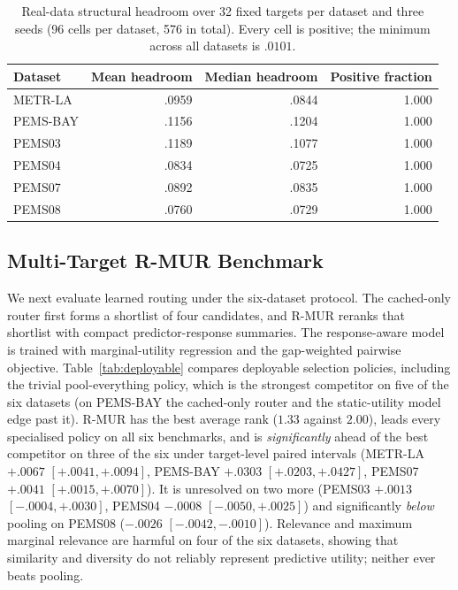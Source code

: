 \begin{table}[t]
\centering
\small
\caption{Real-data structural headroom over 32 fixed targets per dataset and
three seeds (96 cells per dataset, 576 in total). Every cell is positive; the
minimum across all datasets is $.0101$.}
\label{tab:headroom-real}
\begin{tabular}{lrrr}
\toprule
Dataset & Mean headroom & Median headroom & Positive fraction\\
\midrule
METR-LA & .0959 & .0844 & 1.000\\
PEMS-BAY & .1156 & .1204 & 1.000\\
PEMS03 & .1189 & .1077 & 1.000\\
PEMS04 & .0834 & .0725 & 1.000\\
PEMS07 & .0892 & .0835 & 1.000\\
PEMS08 & .0760 & .0729 & 1.000\\
\bottomrule
\end{tabular}
\end{table}

\subsection{Multi-Target R-MUR Benchmark}

We next evaluate learned routing under the six-dataset protocol. The
cached-only router first forms a shortlist of four candidates, and R-MUR
reranks that shortlist with compact predictor-response summaries. The
response-aware model is trained with marginal-utility regression and the
gap-weighted pairwise objective. Table~\ref{tab:deployable} compares
deployable selection policies, including the trivial pool-everything policy,
which is the strongest competitor on five of the six datasets (on PEMS-BAY the
cached-only router and the static-utility model edge past it).
R-MUR has the best average
rank ($1.33$ against $2.00$), leads every specialised policy on all six
benchmarks, and is \emph{significantly} ahead of the best competitor on three of the
six under target-level paired intervals (METR-LA $+.0067$ $[+.0041,+.0094]$,
PEMS-BAY $+.0303$ $[+.0203,+.0427]$, PEMS07 $+.0041$ $[+.0015,+.0070]$). It is
unresolved on two more (PEMS03 $+.0013$ $[-.0004,+.0030]$, PEMS04 $-.0008$
$[-.0050,+.0025]$) and significantly \emph{below} pooling on PEMS08 ($-.0026$
$[-.0042,-.0010]$). Relevance
and maximum marginal relevance are harmful on four of the six datasets, showing
that similarity and diversity do not reliably represent predictive utility;
neither ever beats pooling.

